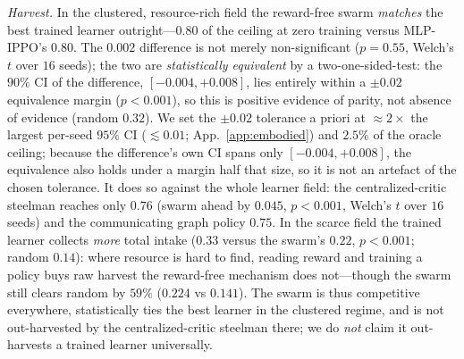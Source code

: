 \documentclass{article}
\begin{document}
\emph{Harvest.} In the clustered, resource-rich field the reward-free swarm \emph{matches} the best trained
learner outright---$0.80$ of the ceiling at zero training versus MLP-IPPO's $0.80$. The $0.002$ difference is not
merely non-significant ($p=0.55$, Welch's $t$ over $16$ seeds); the two are \emph{statistically equivalent} by a
two-one-sided-test: the $90\%$ CI of the difference, $[-0.004,+0.008]$, lies entirely within a $\pm0.02$
equivalence margin ($p<0.001$), so this is positive evidence of parity, not absence of evidence (random $0.32$).
We set the $\pm0.02$ tolerance a priori at ${\approx}2\times$ the largest per-seed $95\%$ CI
($\lesssim0.01$; App.~\ref{app:embodied}) and $2.5\%$ of the oracle ceiling; because the difference's own CI
spans only $[-0.004,+0.008]$, the equivalence also holds under a margin half that size, so it is not an artefact
of the chosen tolerance. It does so against the
whole learner field: the centralized-critic steelman reaches only $0.76$ (swarm ahead by $0.045$, $p<0.001$,
Welch's $t$ over $16$ seeds) and the communicating graph policy $0.75$. In the scarce field the trained learner collects
\emph{more} total intake ($0.33$ versus the swarm's $0.22$, $p<0.001$; random $0.14$): where
resource is hard to find, reading reward and training a policy buys raw harvest the reward-free mechanism does
not---though the swarm still clears random by $59\%$ ($0.224$ vs $0.141$). The swarm is thus competitive everywhere, statistically
ties the best learner in the clustered regime, and is not out-harvested by the centralized-critic steelman
there; we do \emph{not} claim it out-harvests a trained learner universally.
\end{document}
